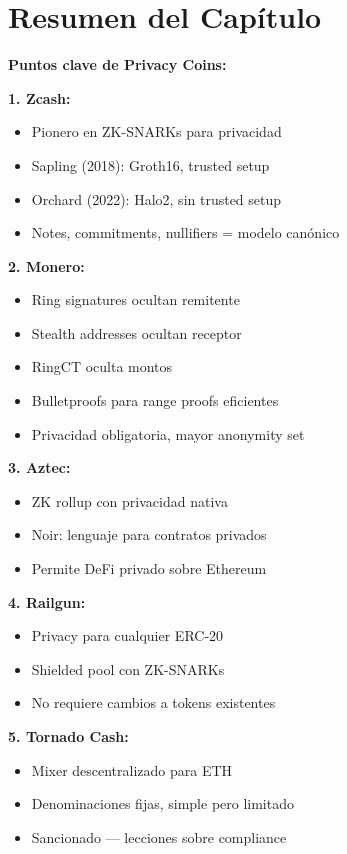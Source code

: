 \documentclass[11pt,a4paper,twoside]{book}
\begin{document}
\section{Resumen del Cap\'itulo}
\label{sec:resumen-cap7}

\begin{keyidea}
\textbf{Puntos clave de Privacy Coins:}

\textbf{1. Zcash:}
\begin{itemize}
    \item Pionero en ZK-SNARKs para privacidad
    \item Sapling (2018): Groth16, trusted setup
    \item Orchard (2022): Halo2, sin trusted setup
    \item Notes, commitments, nullifiers = modelo can\'onico
\end{itemize}

\textbf{2. Monero:}
\begin{itemize}
    \item Ring signatures ocultan remitente
    \item Stealth addresses ocultan receptor
    \item RingCT oculta montos
    \item Bulletproofs para range proofs eficientes
    \item Privacidad obligatoria, mayor anonymity set
\end{itemize}

\textbf{3. Aztec:}
\begin{itemize}
    \item ZK rollup con privacidad nativa
    \item Noir: lenguaje para contratos privados
    \item Permite DeFi privado sobre Ethereum
\end{itemize}

\textbf{4. Railgun:}
\begin{itemize}
    \item Privacy para cualquier ERC-20
    \item Shielded pool con ZK-SNARKs
    \item No requiere cambios a tokens existentes
\end{itemize}

\textbf{5. Tornado Cash:}
\begin{itemize}
    \item Mixer descentralizado para ETH
    \item Denominaciones fijas, simple pero limitado
    \item Sancionado --- lecciones sobre compliance
\end{itemize}


\end{keyidea}
\end{document}
